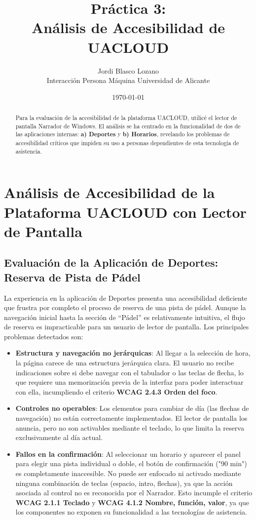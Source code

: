 \documentclass{article}
\title{Práctica 3: \\ Análisis de Accesibilidad de UACLOUD}
\author{
	Jordi Blasco Lozano \\
	\small Interacción Persona Máquina
	\small Universidad de Alicante
}
\date{\today}
\begin{document}
	
	\maketitle

	\begin{abstract}
	\noindent Para la evaluación de la accesibilidad de la plataforma UACLOUD, utilicé el lector de pantalla Narrador de Windows. El análisis se ha centrado en la funcionalidad de dos de las aplicaciones internas:  \textbf{a) Deportes} y \textbf{b) Horarios}, revelando los problemas de accesibilidad críticos que impiden su uso a personas dependientes de esta tecnología de asistencia.
	\end{abstract}



	\section{Análisis de Accesibilidad de la Plataforma UACLOUD con Lector de Pantalla}

    

	\subsection{Evaluación de la Aplicación de Deportes: Reserva de Pista de Pádel}

	La experiencia en la aplicación de Deportes presenta una accesibilidad deficiente que frustra por completo el proceso de reserva de una pista de pádel.	Aunque la navegación inicial hasta la sección de ``Pádel'' es relativamente intuitiva, el flujo de reserva es impracticable para un usuario de lector de pantalla. Los principales problemas detectados son:

	\begin{itemize}
		\item \textbf{Estructura y navegación no jerárquicas}: Al llegar a la selección de hora, la página carece de una estructura jerárquica clara. El usuario no recibe indicaciones sobre si debe navegar con el tabulador o las teclas de flecha, lo que requiere una memorización previa de la interfaz para poder interactuar con ella, incumpliendo el criterio \textbf{WCAG 2.4.3 Orden del foco}.

		\item \textbf{Controles no operables}: Los elementos para cambiar de día (las flechas de navegación) no están correctamente implementados. El lector de pantalla los anuncia, pero no son activables mediante el teclado, lo que limita la reserva exclusivamente al día actual.

		\item \textbf{Fallos en la confirmación}: Al seleccionar un horario y aparecer el panel para elegir una pista individual o doble, el botón de confirmación ("90 min") es completamente inaccesible. No puede ser enfocado ni activado mediante ninguna combinación de teclas (espacio, intro, flechas), ya que la acción asociada al control no es reconocida por el Narrador. Esto incumple el criterio \textbf{WCAG 2.1.1 Teclado} y \textbf{WCAG 4.1.2 Nombre, función, valor}, ya que los componentes no exponen su funcionalidad a las tecnologías de asistencia.
	\end{itemize}
\end{document}
